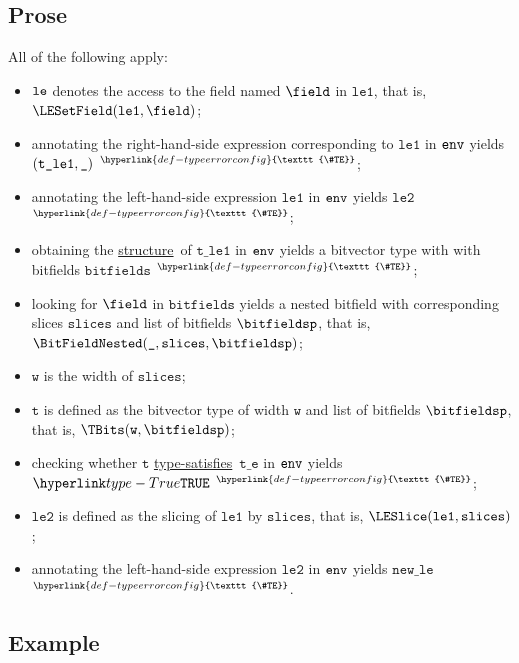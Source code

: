 \documentclass{book}
\newcommand\TypeErrorConfig[0]{\hyperlink{def-typeerrorconfig}{\texttt{\#TE}}}
\newcommand\ProseOrTypeError[0]{\hyperlink{def-proseortypeerror}{$^{\TypeErrorConfig}$}}
\newcommand\structure[0]{\hyperlink{def-structure}{structure}}
\newcommand\typesatisfies[0]{\hyperlink{def-typesatisfies}{type-satisfies}}
\newcommand\vt[0]{\texttt{t}}
\newcommand\vte[0]{\texttt{t\_e}}
\newcommand\vleone[0]{\texttt{le1}}
\newcommand\vletwo[0]{\texttt{le2}}
\newcommand\vtleone[0]{\texttt{t\_le1}}
\newcommand\vw[0]{\texttt{w}}
\newcommand\bitfields[0]{\texttt{bitfields}}
\newcommand\newle[0]{\texttt{new\_le}}
\newcommand\slices[0]{\texttt{slices}}
\begin{document}
\subsection{Prose}
All of the following apply:
\begin{itemize}
\item $\texttt{le}$ denotes the access to the field named $\field$ in $\vleone$, that is, \\ $\LESetField(\vleone, \field)$;
\item annotating the right-hand-side expression corresponding to $\vleone$ in $\texttt{env}$ yields \\ $(\vtleone, \Ignore)$ \ProseOrTypeError;
\item annotating the left-hand-side expression $\vleone$ in $\texttt{env}$ yields $\vletwo$ \ProseOrTypeError;
\item obtaining the \structure\ of $\vtleone$ in $\texttt{env}$ yields a bitvector type with with bitfields $\bitfields$ \ProseOrTypeError;
\item looking for $\field$ in $\bitfields$ yields a nested bitfield with corresponding slices $\slices$ and list of bitfields
      $\bitfieldsp$, that is, \\ $\BitFieldNested(\Ignore, \slices, \bitfieldsp)$;
\item $\vw$ is the width of $\slices$;
\item $\vt$ is defined as the bitvector type of width $\vw$ and list of bitfields $\bitfieldsp$, that is, $\TBits(\vw, \bitfieldsp)$;
\item checking whether $\vt$ \typesatisfies\ $\vte$ in $\texttt{env}$ yields $\True$ \ProseOrTypeError;
\item $\vletwo$ is defined as the slicing of $\vleone$ by $\slices$, that is, $\LESlice(\vleone, \slices)$;
\item annotating the left-hand-side expression $\vletwo$ in $\texttt{env}$ yields $\newle$ \ProseOrTypeError.
\end{itemize}

\subsection{Example}

\end{document}
